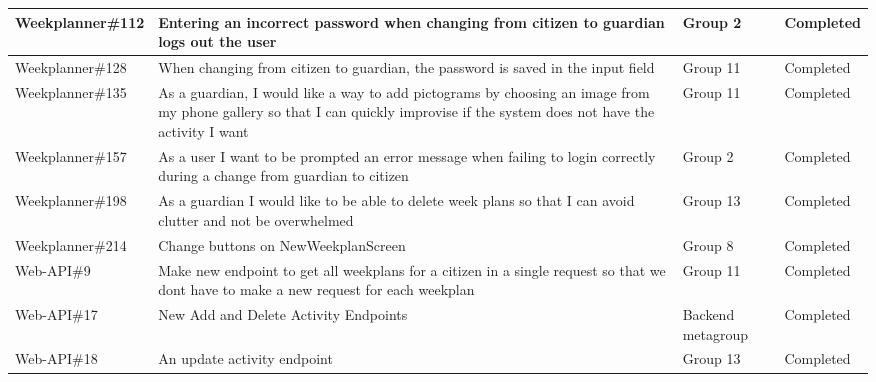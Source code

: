 \begin{longtable}{|p{2.9cm}|p{8cm}|p{2cm}|p{2cm}|}
    Weekplanner\#112 & Entering an incorrect password when changing from citizen to guardian logs out the user                                                                                                 & Group 2      & Completed    \\ \hline
    Weekplanner\#128 & When changing from citizen to guardian, the password is saved in the input field                                                                                                        & Group 11     & Completed    \\ \hline
    Weekplanner\#135 & As a guardian, I would like a way to add pictograms by choosing an image from my phone gallery so that I can quickly improvise if the system does not have the activity I want          & Group 11     & Completed   \\ \hline
    Weekplanner\#157 & As a user I want to be prompted an error message when failing to login correctly during a change from guardian to citizen                                                               & Group 2      & Completed    \\ \hline
    Weekplanner\#198 & As a guardian I would like to be able to delete week plans so that I can avoid clutter and not be overwhelmed                                                                           & Group 13     & Completed    \\ \hline
    Weekplanner\#214 & Change buttons on NewWeekplanScreen                                                                                                                                                     & Group 8      & Completed    \\ \hline
    Web-API\#9 & Make new endpoint to get all weekplans for a citizen in a single request so that we dont have to make a new request for each weekplan                                                                                                                                                      & Group 11      & Completed    \\ \hline
    Web-API\#17 & New Add and Delete Activity Endpoints                                                                                                                                                      & Backend metagroup     & Completed    \\ \hline
    Web-API\#18 & An update activity endpoint                                                                                                                                                      & Group 13     & Completed    \\ \hline

\end{longtable}
